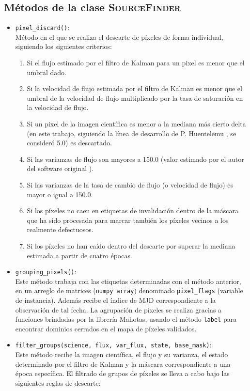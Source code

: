 \begin{appendix}
\section{M\'etodos de la clase \textsc{SourceFinder}}
\label{ap:sourcefinder}
\begin{itemize}
\item \texttt{pixel\_discard()}:\\
M\'etodo en el que se realiza el descarte de p\'ixeles de forma individual, siguiendo los siguientes criterios:
\begin{enumerate}
\item Si el flujo estimado por el filtro de Kalman para un pixel es menor que el umbral dado.
\item Si la velocidad de flujo estimada por el filtro de Kalman es menor que el umbral  de la velocidad de flujo multiplicado por la tasa de saturaci\'on en la velocidad de flujo.
\item Si un pixel de la imagen cient\'ifica es menor a la mediana m\'as cierto delta (en este trabajo, siguiendo la l\'inea de desarrollo de P. Huentelemu \cite{huentelemu}, se consider\'o 5.0) es descartado.
\item Si las varianzas de flujo son mayores a 150.0 (valor estimado por el autor del software original \cite{huentelemu}).
\item Si las varianzas de la tasa de cambio de flujo (o velocidad de flujo) es mayor o igual a 150.0.
\item Si los p\'ixeles no caen en etiquetas de invalidaci\'on dentro de la m\'ascara que ha sido procesada para marcar tambi\'en los p\'ixeles vecinos a los realmente defectuosos.
\item Si los p\'ixeles no han ca\'ido dentro del descarte por superar la mediana estimada a partir de cuatro \'epocas. 
\end{enumerate}
\item \texttt{grouping\_pixels()}:\\
Este m\'etodo trabaja con las etiquetas determinadas con el m\'etodo anterior, en un arreglo de matrices (\texttt{numpy array}) denominado \texttt{pixel\_flags} (variable de instancia). Adem\'as recibe el \'indice de MJD correspondiente a la observaci\'on de tal fecha.
La agrupaci\'on de p\'ixeles se realiza gracias a funciones brindadas por la librer\'ia Mahotas, usando el m\'etodo \texttt{label} para encontrar dominios cerrados en el mapa de p\'ixeles validados.
\bigskip

\item \texttt{filter\_groups(science, flux, var\_flux, state, base\_mask)}:\\
Este m\'etodo recibe la imagen cient\'ifica, el flujo y su varianza, el estado determinado por el filtro de Kalman y la m\'ascara correspondiente a una \'epoca espec\'ifica. 
El filtrado de grupos de p\'ixeles se lleva a cabo bajo las siguientes reglas de descarte: 


\end{itemize}
\end{appendix}
